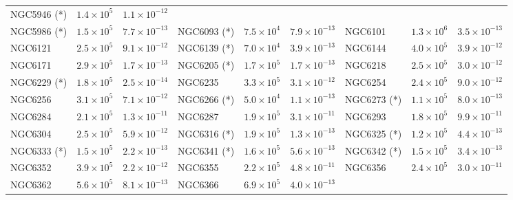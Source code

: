 \begin{table}
\begin{center}
\begin{tabular}{l | c | c | l |  c|   c | l | c | c }
            NGC5946 (*) &  $1.4\times10^5$ &          $1.1\times10^{-12}$  \\
            NGC5986 (*) &  $1.5\times10^5$ &          $7.7\times10^{-13}$  &
            NGC6093 (*) &  $7.5\times10^4$ &          $7.9\times10^{-13}$  &
            NGC6101 &  $1.3\times10^6$ &          $3.5\times10^{-13}$  \\
            NGC6121 &  $2.5\times10^5$ &          $9.1\times10^{-12}$  &
            NGC6139 (*) &  $7.0\times10^4$ &          $3.9\times10^{-13}$  &
            NGC6144 &  $4.0\times10^5$ &          $3.9\times10^{-12}$  \\
            NGC6171 &  $2.9\times10^5$ &          $1.7\times10^{-13}$  &
            NGC6205 (*) &  $1.7\times10^5$ &          $1.7\times10^{-13}$  &
            NGC6218 &  $2.5\times10^5$ &          $3.0\times10^{-12}$  \\
            NGC6229 (*) &  $1.8\times10^5$ &          $2.5\times10^{-14}$ &
            NGC6235 &  $3.3\times10^5$ &          $3.1\times10^{-12}$  &
            NGC6254 &  $2.4\times10^5$ &          $9.0\times10^{-12}$ \\
            NGC6256 &  $3.1\times10^5$ &          $7.1\times10^{-12}$  &
            NGC6266 (*)&  $5.0\times10^4$ &          $1.1\times10^{-13}$  &
            NGC6273 (*) &  $1.1\times10^5$ &          $8.0\times10^{-13}$  \\
            NGC6284 &  $2.1\times10^5$ &          $1.3\times10^{-11}$  &
            NGC6287 &  $1.9\times10^5$ &          $3.1\times10^{-11}$  &
            NGC6293 &  $1.8\times10^5$ &          $9.9\times10^{-11}$ \\
            NGC6304 &  $2.5\times10^5$ &          $5.9\times10^{-12}$  &
            NGC6316 (*) &  $1.9\times10^5$ &          $1.3\times10^{-13}$  &
            NGC6325 (*) &  $1.2\times10^5$ &          $4.4\times10^{-13}$  \\
            NGC6333 (*) &   $1.5\times10^5$ &          $2.2\times10^{-13}$ &
            NGC6341 (*) &  $1.6\times10^5$ &          $5.6\times10^{-13}$  &
            NGC6342 (*) &  $1.5\times10^5$ &          $3.4\times10^{-13}$  \\
            NGC6352 &  $3.9\times10^5$ &          $2.2\times10^{-12}$  &
            NGC6355 &   $2.2\times10^5 $ &          $4.8\times10^{-11}$  &
            NGC6356 &  $2.4\times10^5$ &          $3.0\times10^{-11}$  \\
            NGC6362 &  $5.6\times10^5$ &          $8.1\times10^{-13}$  &
            NGC6366 &  $6.9\times10^5$ &          $4.0\times10^{-13}$ &

\end{tabular}
\end{center}
\end{table}
